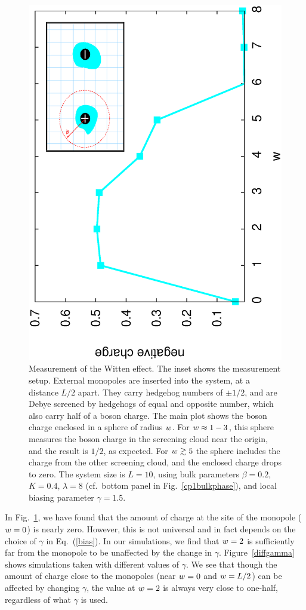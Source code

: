 \begin{figure}
\includegraphics[angle=-90,width=0.6\linewidth]{figures/wittenout.eps}
\caption{Measurement of the Witten effect. The inset shows the measurement setup. External monopoles are inserted into the system, at a distance $L/2$ apart. They carry hedgehog numbers of $\pm 1/2$, and are Debye screened by hedgehogs of equal and opposite number, which also carry half of a boson charge. The main plot shows the boson charge enclosed in a sphere of radius $\scripty{r}$. For $\scripty{r}\approx 1-3$, this sphere measures the boson charge in the screening cloud near the origin, and the result is $1/2$, as expected. For $\scripty{r}\gtrsim 5$ the sphere includes the charge from the other screening cloud, and the enclosed charge drops to zero. The system size is $L=10$, using bulk parameters $\beta=0.2$, $K=0.4$, $\lambda=8$ (cf.\ bottom panel in Fig.~\ref{cp1bulkphase}), and local biasing parameter $\gamma=1.5$.}
\label{witten}
\end{figure}

In Fig.~\ref{witten}, we have found that the amount of charge at the site of the monopole ($\scripty{r}=0$) is nearly zero. However, this is not universal and in fact depends on the choice of $\gamma$ in Eq.~(\ref{bias}). 
In our simulations, we find that $\scripty{r}=2$ is sufficiently far from the monopole to be unaffected by the change in $\gamma$. Figure~\ref{diffgamma} shows simulations taken with different values of $\gamma$. We see that though the amount of charge close to the monopoles (near $\scripty{r}=0$ and $\scripty{r}=L/2$) can be affected by changing $\gamma$, the value at $\scripty{r}=2$ is always very close to one-half, regardless of what $\gamma$ is used.

